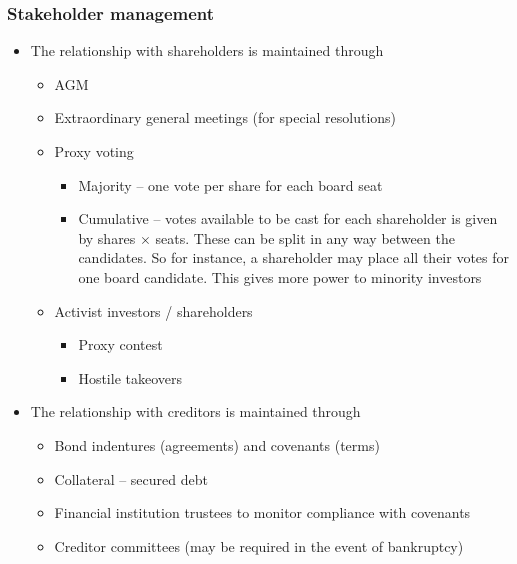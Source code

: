 \documentclass[../notes_compiled.tex]{subfiles}
\begin{document}
\subsubsection{Stakeholder management}
\label{voting}
\begin{itemize}
\item The relationship with shareholders is maintained through
\begin{itemize}
\item  AGM
\item Extraordinary general meetings (for special resolutions)
\item Proxy voting
\begin{itemize}
\item Majority -- one vote per share for each board seat
\item Cumulative -- votes available to be cast for each shareholder is given by shares $\times$ seats. These can be split in any way between the candidates. So for instance, a shareholder may place all their votes for one board candidate. This gives more power to minority investors
\end{itemize}
\item Activist investors / shareholders
\begin{itemize}
\item Proxy contest
\item Hostile takeovers
\end{itemize}
\end{itemize}

\item The relationship with creditors is maintained through
\begin{itemize}
\item Bond indentures (agreements) and covenants (terms)
\item Collateral -- secured debt
\item Financial institution trustees to monitor compliance with covenants
\item Creditor committees (may be required in the event of  bankruptcy)
\end{itemize}



\end{itemize}
\end{document}
